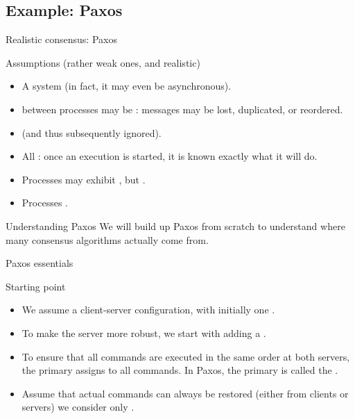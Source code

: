 \subsection{Example: Paxos}
\begin{slide}{Realistic consensus: Paxos}
  \begin{block}{Assumptions (rather weak ones, and realistic)}
    \begin{itemize}
    \item A  system (in fact, it may even be asynchronous).
    \item {} between processes may be : messages may be lost, duplicated,
      or reordered.
    \item {} (and thus subsequently ignored).
    \item All : once an execution is started, it is known exactly what it
      will do.
    \item Processes may exhibit , but .
    \item Processes .
    \end{itemize}
  \end{block}
  \begin{alertblock}{Understanding Paxos}
    We will build up Paxos from scratch to understand where many consensus algorithms actually come from.
  \end{alertblock}
\end{slide}
\begin{slide}{Paxos essentials}
  \begin{block}{Starting point}
    \begin{itemize}
    \item We assume a client-server configuration, with initially one .
    \item To make the server more robust, we start with adding a .
    \item To ensure that all commands are executed in the same order at both servers, the primary assigns
       to all commands. In Paxos, the primary is called the .
    \item Assume that actual commands can always be restored (either from clients or servers)
      \mathexpr{\Rightarrow} we consider only .
    \end{itemize}
  \end{block}
\end{slide}

